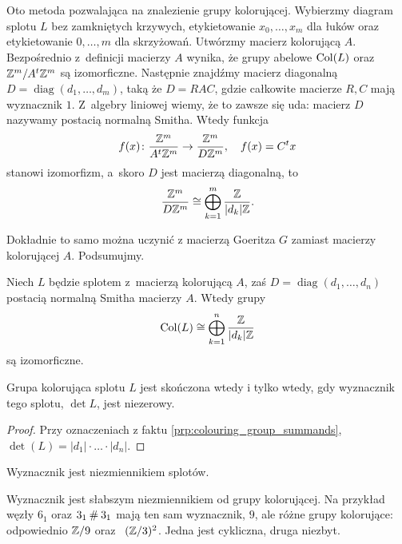 Oto metoda pozwalająca na znalezienie grupy kolorującej.
Wybierzmy diagram splotu $L$ bez zamkniętych krzywych, etykietowanie $x_0, \ldots, x_m$ dla łuków oraz etykietowanie $0, \ldots, m$ dla skrzyżowań.
Utwórzmy macierz kolorującą $A$.
Bezpośrednio z~definicji macierzy $A$ wynika, że grupy abelowe $\operatorname{Col}(L)$ oraz $\mathbb Z^m / A^t \mathbb Z^m$ są izomorficzne.
Następnie znajdźmy macierz diagonalną $D = \operatorname{diag}(d_1, \ldots, d_m)$, taką że $D = RAC$, gdzie całkowite macierze $R, C$ mają wyznacznik $1$.
Z~algebry liniowej wiemy, że to zawsze się uda: macierz $D$ nazywamy postacią normalną Smitha.
Wtedy funkcja
\begin{equation}
    f(x) \colon \frac{\mathbb Z^m}{A^t \mathbb Z^m} \to \frac{\mathbb Z^m}{D\mathbb Z^m}, \quad f(x) = C^t x
\end{equation}
stanowi izomorfizm, a~skoro $D$ jest macierzą diagonalną, to
\begin{equation}
    \frac{\mathbb Z^m}{D\mathbb Z^m} \cong \bigoplus_{k=1}^m \frac{\mathbb Z}{|d_k| \mathbb Z}.
\end{equation}

Dokładnie to samo można uczynić z macierzą Goeritza $G$ zamiast macierzy kolorującej $A$.
Podsumujmy.

\begin{proposition}
\label{prp:colouring_group_summands}%
    Niech $L$ będzie splotem z~macierzą kolorującą $A$, zaś $D = \operatorname{diag}(d_1, \ldots, d_n)$ postacią normalną Smitha macierzy $A$.
    Wtedy grupy 
    \begin{equation}
        \operatorname{Col}(L) \cong \bigoplus_{k=1}^n \frac{\mathbb Z}{|d_k| \mathbb Z}
    \end{equation}
    są izomorficzne.
\end{proposition}

\begin{corollary}
    Grupa kolorująca splotu $L$ jest skończona wtedy i tylko wtedy, gdy wyznacznik tego splotu, $\det L$, jest niezerowy.
\end{corollary}

\begin{proof}
    Przy oznaczeniach z faktu \ref{prp:colouring_group_summands}, $\det(L) = |d_1| \cdot \ldots \cdot |d_n|$.
\end{proof}

\begin{corollary}
%
\label{cor:determinant_invariant}%
    Wyznacznik jest niezmiennikiem splotów.
\end{corollary}

Wyznacznik jest słabszym niezmiennikiem od grupy kolorującej.
Na przykład węzły $6_1$ oraz $3_1 \mathbin{\#} 3_1$ mają ten sam wyznacznik, $9$, ale różne grupy kolorujące: odpowiednio $\mathbb Z/9$ oraz ~$(\mathbb Z/3)^2$.
Jedna jest cykliczna, druga niezbyt.

